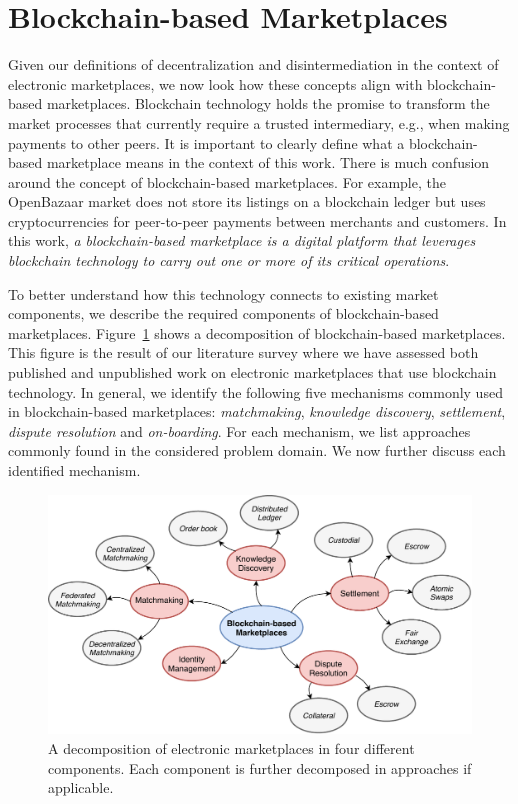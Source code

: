 \section{Blockchain-based Marketplaces}
Given our definitions of decentralization and disintermediation in the context of electronic marketplaces, we now look how these concepts align with blockchain-based marketplaces.
Blockchain technology holds the promise to transform the market processes that currently require a trusted intermediary, e.g., when making payments to other peers.
It is important to clearly define what a blockchain-based marketplace means in the context of this work.
There is much confusion around the concept of blockchain-based marketplaces.
For example, the OpenBazaar market does not store its listings on a blockchain ledger but uses cryptocurrencies for peer-to-peer payments between merchants and customers.
In this work, \emph{a blockchain-based marketplace is a digital platform that leverages blockchain technology to carry out one or more of its critical operations}.

To better understand how this technology connects to existing market components, we describe the required components of blockchain-based marketplaces.
Figure~\ref{fig:electronic_markets} shows a decomposition of blockchain-based marketplaces.
This figure is the result of our literature survey where we have assessed both published and unpublished work on electronic marketplaces that use blockchain technology.
In general, we identify the following five mechanisms commonly used in blockchain-based marketplaces: \emph{matchmaking}, \emph{knowledge discovery}, \emph{settlement}, \emph{dispute resolution} and \emph{on-boarding}.
For each mechanism, we list approaches commonly found in the considered problem domain.
We now further discuss each identified mechanism. %

\begin{figure}[t]
	\centering
	\includegraphics[width=\linewidth]{introduction/assets/decomposition}
	\caption{A decomposition of electronic marketplaces in four different components. Each component is further decomposed in approaches if applicable.}
	\label{fig:electronic_markets}
\end{figure}

